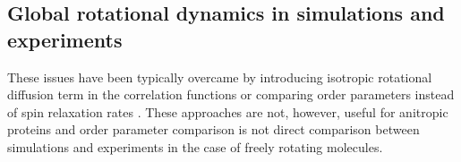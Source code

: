 \documentclass[pre,aps,floatfix,authordate1-4,twocolumn]{revtex4-1}
\begin{document}

\subsection{Global rotational dynamics in simulations and experiments}
These issues have been typically
overcame by introducing isotropic rotational diffusion term in the correlation
functions \cite{??} or comparing order parameters instead of spin relaxation rates \cite{??}.
These approaches are not, however, useful for anitropic proteins and order
parameter comparison is not direct comparison between simulations and experiments in
the case of freely rotating molecules. 
\end{document}
